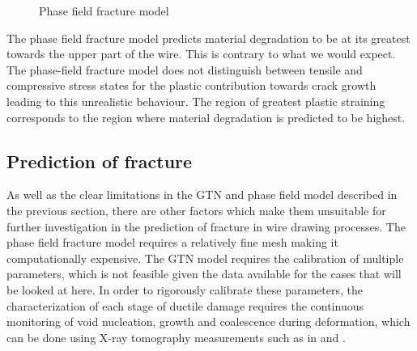 \documentclass[sn-mathphys,Numbered,draft]{sn-jnl}%
\begin{document}
\begin{figure}[t!]
	\centering
	  \qquad
		\caption{Phase field fracture model}
	\label{label_for_entire_figure}
\end{figure}
\FloatBarrier

The phase field fracture model predicts material degradation to be at its greatest towards the upper part of the wire. This is contrary to what we would expect. The phase-field fracture model does not distinguish between tensile and compressive stress states for the plastic contribution towards crack growth leading to this unrealistic behaviour. The region of greatest plastic straining corresponds to the region where material degradation is predicted to be highest.

\subsection{Prediction of fracture}

As well as the clear limitations in the GTN and phase field model described in the previous section, there are other factors which make them unsuitable for further investigation in the prediction of fracture in wire drawing processes. The phase field fracture model requires a relatively fine mesh \cite{borden_phase-field_2016} making it computationally expensive. The GTN model requires the calibration of multiple parameters, which is not feasible given the data available for the cases that will be looked at here. In order to rigorously calibrate these parameters, the characterization of each stage of ductile damage requires the continuous monitoring of void nucleation, growth and coalescence during
deformation, which can be done using X-ray tomography measurements such as in \citet{thuillier_ductile_2012} and \citet{fansi_numerical_2013}. 
\end{document}
